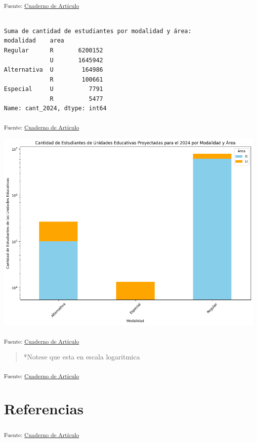 \documentclass[
  12pt]{article}
\begin{document}
\textsubscript{Fuente:
\href{https://sociest.github.io/ue-report/index.ipynb.html}{Cuaderno de
Artículo}}

\begin{verbatim}

Suma de cantidad de estudiantes por modalidad y área:
modalidad    area
Regular      R       6200152
             U       1645942
Alternativa  U        164986
             R        100661
Especial     U          7791
             R          5477
Name: cant_2024, dtype: int64
\end{verbatim}

\textsubscript{Fuente:
\href{https://sociest.github.io/ue-report/index.ipynb.html}{Cuaderno de
Artículo}}

\includegraphics{index_files/figure-pdf/cell-35-output-1.png}

\textsubscript{Fuente:
\href{https://sociest.github.io/ue-report/index.ipynb.html}{Cuaderno de
Artículo}}

\begin{quote}
*Notese que esta en escala logaritmica
\end{quote}

\textsubscript{Fuente:
\href{https://sociest.github.io/ue-report/index.ipynb.html}{Cuaderno de
Artículo}}

\section*{Referencias}\label{referencias}

\textsubscript{Fuente:
\href{https://sociest.github.io/ue-report/index.ipynb.html}{Cuaderno de
Artículo}}


  
\end{document}
